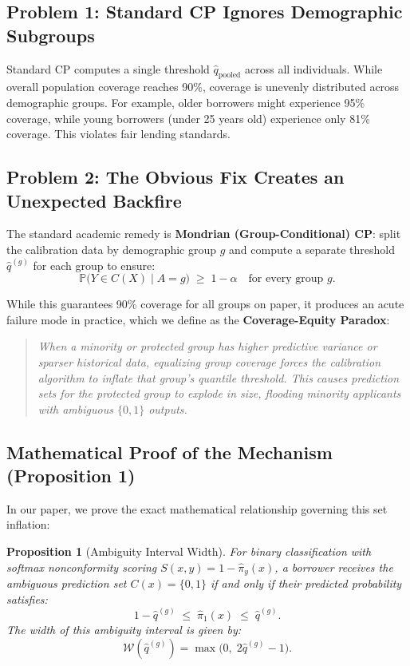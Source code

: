 \documentclass[11pt,a4paper]{article}
\newtheorem{proposition}{Proposition}
\begin{document}
\subsection{Problem 1: Standard CP Ignores Demographic Subgroups}
Standard CP computes a single threshold $\hat{q}_{\text{pooled}}$ across all individuals. While overall population coverage reaches 90\%, coverage is unevenly distributed across demographic groups. For example, older borrowers might experience 95\% coverage, while young borrowers (under 25 years old) experience only 81\% coverage. This violates fair lending standards.

\subsection{Problem 2: The Obvious Fix Creates an Unexpected Backfire}
The standard academic remedy is \textbf{Mondrian (Group-Conditional) CP}: split the calibration data by demographic group $g$ and compute a separate threshold $\hat{q}^{(g)}$ for each group to ensure:
\begin{equation}
\mathbb{P}\bigl(Y \in C(X) \mid A = g\bigr) \;\ge\; 1 - \alpha \quad \text{for every group } g.
\end{equation}

While this guarantees 90\% coverage for all groups on paper, it produces an acute failure mode in practice, which we define as the \textbf{Coverage-Equity Paradox}:
\begin{quote}
\emph{When a minority or protected group has higher predictive variance or sparser historical data, equalizing group coverage forces the calibration algorithm to inflate that group's quantile threshold. This causes prediction sets for the protected group to explode in size, flooding minority applicants with ambiguous $\{0, 1\}$ outputs.}
\end{quote}

\subsection{Mathematical Proof of the Mechanism (Proposition 1)}
In our paper, we prove the exact mathematical relationship governing this set inflation:

\begin{proposition}[Ambiguity Interval Width]
For binary classification with softmax nonconformity scoring $S(x, y) = 1 - \hat{\pi}_y(x)$, a borrower receives the ambiguous prediction set $C(x) = \{0, 1\}$ if and only if their predicted probability satisfies:
\begin{equation}
1 - \hat{q}^{(g)} \;\le\; \hat{\pi}_1(x) \;\le\; \hat{q}^{(g)}.
\end{equation}
The width of this ambiguity interval is given by:
\begin{equation}
\mathcal{W}(\hat{q}^{(g)}) = \max\bigl(0,\; 2\hat{q}^{(g)} - 1\bigr).
\end{equation}
\end{proposition}
\end{document}
